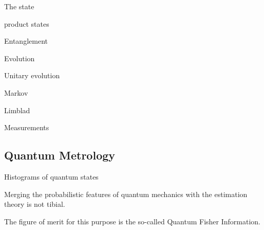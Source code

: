 The state

product states

Entanglement

Evolution

Unitary evolution

Markov

Limblad

Measurements

\subsection{Quantum Metrology}

Histograms of quantum states

Merging the probabilistic features of quantum mechanics with the estimation theory is not tibial.

The figure of merit for this purpose is the so-called Quantum Fisher Information.
